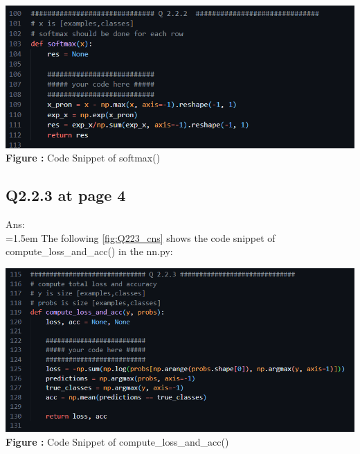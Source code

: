 \documentclass{article}
\begin{document}
	\begin{minipage}{1\linewidth}
		\centering
		\hspace{0.12\linewidth} 
		\includegraphics[width=0.7\linewidth]{./Q222_cns.png}  %
		\newline
		\textbf{Figure \thefigure:} Code Snippet of softmax() %
		\label{fig:Q222_cns}  %
	\end{minipage}	
	
	\newpage
	\subsection*{Q2.2.3 at page 4}
	Ans:\\
	\hangindent=1.5em \hspace{1.5em}  The following \autoref{fig:Q223_cns} shows the code snippet of compute\_loss\_and\_acc() in the nn.py:
	\newline

	\begin{minipage}{1\linewidth}
		\centering
		\hspace{0.12\linewidth} 
		\includegraphics[width=0.7\linewidth]{./Q223_cns.png}  %
		\newline
		\textbf{Figure \thefigure:} Code Snippet of compute\_loss\_and\_acc() %
		\label{fig:Q223_cns}  %
	\end{minipage}	
	
	\newpage
	
\end{document}
